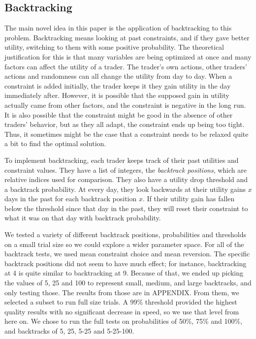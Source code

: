 \documentclass[12pt,a4paper,titlepage]{article}
\begin{document}
\subsection{Backtracking}\label{backtrack}

The main novel idea in this paper is the application of backtracking to this problem.
Backtracking means looking at past constraints, and if they gave better utility, switching to them with some positive probability.
The theoretical justification for this is that many variables are being optimized at once and many factors can affect the utility of a trader.
The trader's own actions, other traders' actions and randomness can all change the utility from day to day.
When a constraint is added initially, the trader keeps it they gain utility in the day immediately after.
However, it is possible that the supposed gain in utility actually came from other factors, and the constraint is negative in the long run.
It is also possible that the constraint might be good in the absence of other traders' behavior, but as they all adapt, the constraint ends up being too tight.
Thus, it sometimes might be the case that a constraint needs to be relaxed quite a bit to find the optimal solution.

To implement backtracking, each trader keeps track of their past utilities and constraint values.
They have a list of integers, the \textit{backtrack positions}, which are relative indices used for comparison.
They also have a utility drop threshold and a backtrack probability.
At every day, they look backwards at their utility gains $x$ days in the past for each backtrack position $x$.
If their utility gain has fallen below the threshold since that day in the past, they will reset their constraint to what it was on that day with backtrack probability.

We tested a variety of different backtrack positions, probabilities and thresholds on a small trial size so we could explore a wider parameter space.
For all of the backtrack tests, we used mean constraint choice and mean reversion.
The specific backtrack positions did not seem to have much effect; for instance, backtracking at 4 is quite similar to backtracking at 9. 
Because of that, we ended up picking the values of 5, 25 and 100 to represent small, medium, and large backtracks, and only testing those.
The results from those are in APPENDIX.
From them, we selected a subset to run full size trials.
A 99\% threshold provided the highest quality results with no significant decrease in speed, so we use that level from here on.
We chose to run the full tests on probabilities of 50\%, 75\% and 100\%, and backtracks of 5, 25, 5-25 and 5-25-100. 
\end{document}
